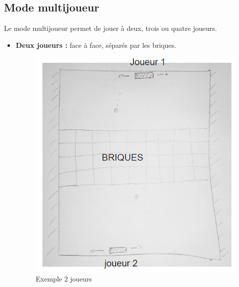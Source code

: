 \documentclass[12pt]{article}
\begin{document}
	\subsection{Mode multijoueur}
	Le mode multijoueur permet de jouer à deux, trois ou quatre joueurs.
	\begin{itemize}
	\item \textbf{Deux joueurs : }face à face, séparés par les briques.\\
	\begin{figure}[!htp]
  			\caption{\label{étiquette} Exemple 2 joueurs}
  			\centerline{\includegraphics[scale=0.9]{multi_2_joueurs}}
	\end{figure}
	\newpage
	

\end{itemize}
\end{document}
